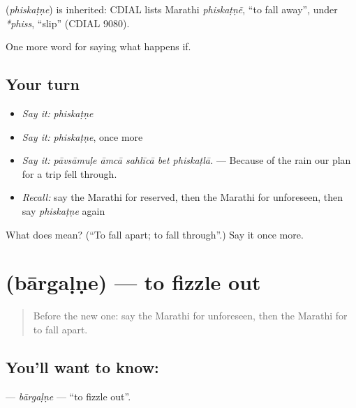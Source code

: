 \begin{cousinweb}
\textbf{} (\emph{phiskaṭṇe}) is inherited: CDIAL lists Marathi \emph{phiskaṭṇẽ}, \textquotedblleft{}to fall away\textquotedblright{}, under \emph{*phiss}, \textquotedblleft{}slip\textquotedblright{} (CDIAL 9080).
\end{cousinweb}

\begin{grammarlens}[title={What you've built}]
One more word for saying what happens if.
\end{grammarlens}

\subsection*{Your turn}
\begin{itemize}
\raggedright
  \item \emph{Say it:} \emph{phiskaṭṇe}
  \item \emph{Say it:} \emph{phiskaṭṇe}, once more
  \item \emph{Say it:} \emph{pāvsāmuḷe āmcā sahlīcā bet phiskaṭlā.} — Because of the rain our plan for a trip fell through.
  \item \emph{Recall:} say the Marathi for reserved, then the Marathi for unforeseen, then say \emph{phiskaṭṇe} again
\end{itemize}

\begin{tcolorbox}[breakable,colback=teal!4,colframe=teal!35!black,title={Before you move on}]
What does  mean? (\textquotedblleft{}To fall apart; to fall through\textquotedblright{}.) Say it once more.
\end{tcolorbox}
\section[\texorpdfstring{\mr{बारगळणे} (bārgaḷṇe)}{बारगळणे (bārgaḷṇe)}]{ (bārgaḷṇe) — to fizzle out}

\label{lesson:MR-C552-bargalne}



\begin{quote}
Before the new one: say the Marathi for unforeseen, then the Marathi for to fall apart.
\end{quote}

\subsection*{You'll want to know: }
\textbf{} — \emph{bārgaḷṇe} — \textquotedblleft{}to fizzle out\textquotedblright{}.


